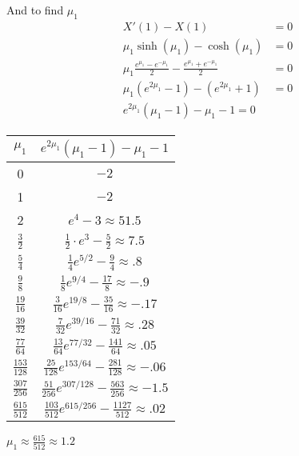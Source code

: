 \documentclass{article}
\begin{document}
And to find $\mu_1$
\begin{align*}
  X'(1)-X(1)&=0\\
  \mu_1\sinh(\mu_1)-\cosh(\mu_1)&=0\\
  \mu_1\frac{e^{\mu_1}-e^{-\mu_1}}{2}-\frac{e^{\mu_1}+e^{-\mu_1}}{2}&=0\\
  \mu_1(e^{2\mu_1}-1)-(e^{2\mu_1}+1)&=0\\
  e^{2\mu_1}(\mu_1-1)-\mu_1-1=0
\end{align*}
\begin{center}
\begin{tabular}{c|c}
$\mu_1$&$e^{2\mu_1}(\mu_1-1)-\mu_1-1$\\
\hline
0&$-2$\\
\hline
1&$-2$\\
\hline
2&$e^4-3\approx51.5$\\
\hline
$\frac{3}{2}$&$\frac{1}{2}\cdot e^3-\frac{5}{2}\approx7.5$\\
\hline
$\frac{5}{4}$&$\frac{1}{4}e^{5/2}-\frac{9}{4}\approx.8$\\
\hline
$\frac{9}{8}$&$\frac{1}{8}e^{9/4}-\frac{17}{8}\approx-.9$\\
\hline
$\frac{19}{16}$&$\frac{3}{16}e^{19/8}-\frac{35}{16}\approx-.17$\\
\hline
$\frac{39}{32}$&$\frac{7}{32}e^{39/16}-\frac{71}{32}\approx.28$\\
\hline
$\frac{77}{64}$&$\frac{13}{64}e^{77/32}-\frac{141}{64}\approx.05$\\
\hline
$\frac{153}{128}$&$\frac{25}{128}e^{153/64}-\frac{281}{128}\approx-.06$\\
\hline
$\frac{307}{256}$&$\frac{51}{256}e^{307/128}-\frac{563}{256}\approx-1.5$\\
\hline
$\frac{615}{512}$&$\frac{103}{512}e^{615/256}-\frac{1127}{512}\approx.02$\\
\hline

\end{tabular}

$\mu_1\approx\frac{615}{512}\approx1.2$
\end{center}
\end{document}
